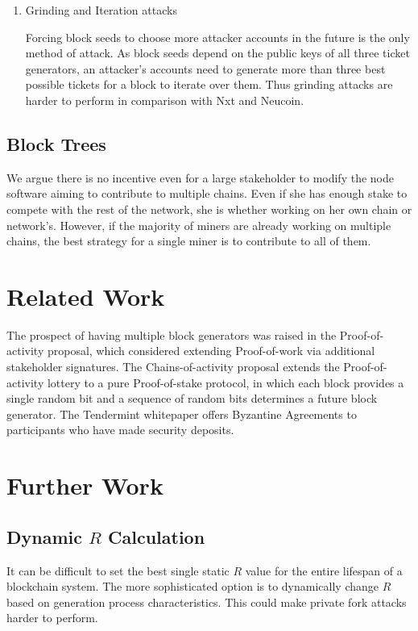 \documentclass[preprint,review,3p,times,twocolumn]{elsarticle}
\begin{document}
\begin{enumerate}
\item Grinding and Iteration attacks

Forcing block seeds to choose more attacker accounts in the future is the only method of attack. As block seeds depend on the public keys of all three ticket generators, an attacker's accounts need to generate more than three best possible tickets for a block to iterate over them. Thus grinding attacks are harder to perform in comparison with Nxt and Neucoin. 

\end{enumerate}

\subsection{Block Trees}

We argue there is no incentive even for a large stakeholder to modify the node software aiming to contribute to multiple chains. Even if she has enough stake to compete with the rest of the network, she is whether working on her own chain or network's. However, if the majority of miners are already working on multiple chains, the best strategy for a single miner is to contribute to all of them. 

\section{Related Work}
\label{s_related}

The prospect of having multiple block generators was raised in the Proof-of-activity proposal\cite{Bentov2013}, which considered extending Proof-of-work via additional stakeholder signatures. The Chains-of-activity proposal\cite{Bentov2014} extends the Proof-of-activity lottery to a pure Proof-of-stake protocol, in which each block provides a single random bit and a sequence of random bits determines a future block generator. The Tendermint whitepaper\cite{Kwon} offers Byzantine Agreements to participants who have made security deposits.


\section{Further Work}
\label{s_further}

\subsection{Dynamic \(R\) Calculation}

It can be difficult to set the best single static \(R\) value for the entire lifespan of a blockchain system. The more sophisticated option is to dynamically change \(R\) based on generation process characteristics. This could make private fork attacks harder to perform.
\end{document}
